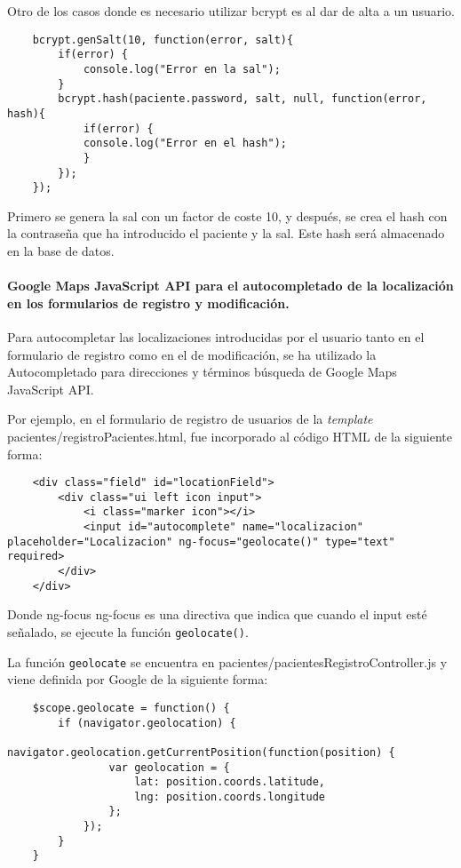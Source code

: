 Otro de los casos donde es necesario utilizar bcrypt es al dar de alta a un usuario.


\medskip
\begin{lstlisting}
	bcrypt.genSalt(10, function(error, salt){
		if(error) {
			console.log("Error en la sal");
		}
		bcrypt.hash(paciente.password, salt, null, function(error, hash){
			if(error) {
			console.log("Error en el hash");
			} 
		});
	});
\end{lstlisting}


Primero se genera la sal con un factor de coste 10, y después, se crea el hash con la contraseña que ha introducido el paciente y la sal. Este hash será almacenado en la base de datos.


\paragraph*{Google Maps JavaScript API para el autocompletado de la localización en los formularios de registro y modificación.}
Para autocompletar las localizaciones introducidas por el usuario tanto en el formulario de registro como en el de modificación, se ha utilizado la Autocompletado para direcciones y términos búsqueda de Google Maps JavaScript API. 


Por ejemplo, en el formulario de registro de usuarios de la \textit{template} pacientes/registroPacientes.html, fue incorporado al código HTML de la siguiente forma:


\medskip
\begin{lstlisting}
	<div class="field" id="locationField">
		<div class="ui left icon input">
			<i class="marker icon"></i>
			<input id="autocomplete" name="localizacion" placeholder="Localizacion" ng-focus="geolocate()" type="text" required>
		</div>
	</div>
\end{lstlisting}


Donde ng-focus ng-focus es una directiva que indica que cuando el input esté señalado, se ejecute la función \texttt{geolocate()}.


La función \texttt{geolocate} se encuentra en pacientes/pacientesRegistroController.js y viene definida por Google de la siguiente forma:


\medskip
\begin{lstlisting}
	$scope.geolocate = function() {
		if (navigator.geolocation) {
			navigator.geolocation.getCurrentPosition(function(position) {
				var geolocation = {
					lat: position.coords.latitude,
					lng: position.coords.longitude
				};
			});
		}
	}
\end{lstlisting}


